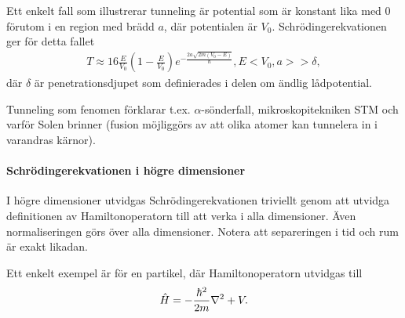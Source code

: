 Ett enkelt fall som illustrerar tunneling är potential som är konstant lika med $0$ förutom i en region med brädd $a$, där potentialen är $V_{0}$. Schrödingerekvationen ger för detta fallet
\begin{align*}
	T \approx 16\frac{E}{V_{0}}\left(1 - \frac{E}{V_{0}}\right)e^{-\frac{2a\sqrt{2m(V_{0} - E)}}{\hbar}}, E < V_{0}, a >> \delta,
\end{align*}
där $\delta$ är penetrationsdjupet som definierades i delen om ändlig lådpotential.

Tunneling som fenomen förklarar t.ex. $\alpha$-sönderfall, mikroskopitekniken STM och varför Solen brinner (fusion möjliggörs av att olika atomer kan tunnelera in i varandras kärnor).

\paragraph{Schrödingerekvationen i högre dimensioner}
I högre dimensioner utvidgas Schrödingerekvationen triviellt genom att utvidga definitionen av Hamiltonoperatorn till att verka i alla dimensioner. Även normaliseringen görs över alla dimensioner. Notera att separeringen i tid och rum är exakt likadan.

Ett enkelt exempel är för en partikel, där Hamiltonoperatorn utvidgas till
\begin{align*}
	\hat{H} = -\frac{\hbar^{2}}{2m}\laplacian + V.
\end{align*}